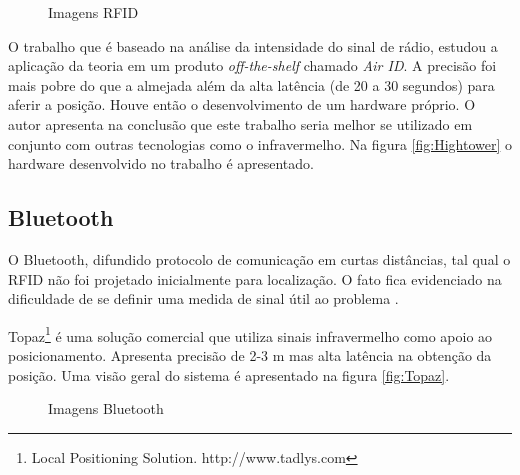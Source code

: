 \begin{figure}
\centering
{}
\caption{Imagens RFID}
\end{figure}


O trabalho \cite{Hightower2001} que é baseado na análise da intensidade do sinal de rádio, estudou a aplicação da teoria em um produto \textit{off-the-shelf} chamado \textit{Air ID}. A precisão foi mais pobre do que a almejada além da alta latência (de 20 a 30 segundos) para aferir a posição. Houve então o desenvolvimento de um hardware próprio. O autor apresenta na conclusão que este trabalho seria melhor se utilizado em conjunto com outras tecnologias como o infravermelho. Na figura \ref{fig:Hightower} o hardware desenvolvido no trabalho é apresentado.


\subsection*{Bluetooth}
O Bluetooth, difundido protocolo de comunicação em curtas distâncias, tal qual o RFID não foi projetado inicialmente para localização. O fato fica evidenciado na dificuldade de se definir uma medida de sinal útil ao problema \cite{Kotanen2003}.

Topaz\footnote{Local Positioning Solution. http://www.tadlys.com} é uma solução comercial que utiliza sinais infravermelho como apoio ao posicionamento. Apresenta precisão de 2-3 m mas alta latência na obtenção da posição. Uma visão geral do sistema é apresentado na figura \ref{fig:Topaz}.

\begin{figure}
\centering
{}
\caption{Imagens Bluetooth}
\end{figure}


